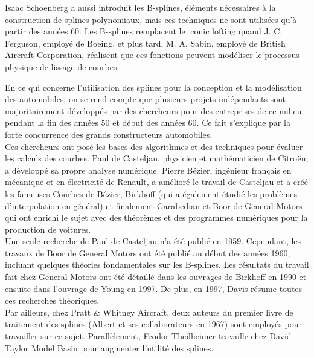 \documentclass{article}
\begin{document}
\indent
	Isaac Schoenberg a aussi introduit les B-splines, \'{e}l\'{e}ments n\'{e}cessaires \`{a} la construction de splines polynomiaux, mais ces techniques ne sont utilis\'{e}es qu'\`{a} partir des ann\'{e}es 60. Les B-splines remplacent le \guillemotleft $\;$conic lofting \guillemotright quand J. C. Ferguson, employ\'{e} de Boeing, et plus tard, M. A. Sabin, employ\'{e} de British Aircraft Corporation, r\'{e}alisent que ces fonctions peuvent mod\'{e}liser le processus physique de lissage de courbes.
\par
	En ce qui concerne l'utilisation des splines pour la conception et la mod\'{e}lisation des automobiles, on se rend compte que plusieurs projets ind\'{e}pendants sont majoritairement d\'{e}velopp\'{e}s par des chercheurs pour des entreprises de ce milieu pendant la fin des ann\'{e}es 50 et d\'{e}but des ann\'{e}es 60. Ce fait s'explique par la forte concurrence des grands constructeurs automobiles.
\\
\indent
	Ces chercheurs ont pos\'{e} les bases des algorithmes et des techniques pour \'{e}valuer les calculs des courbes. Paul de Casteljau, physicien et math\'{e}maticien de Citro\"{e}n, a d\'{e}velopp\'{e} sa propre analyse num\'{e}rique. Pierre B\'{e}zier, ing\'{e}nieur français en m\'{e}canique et en \'{e}lectricit\'{e} de Renault, a am\'{e}lior\'{e} le travail de Casteljau et a cr\'{e}\'{e} les fameuses Courbes de B\'{e}zier, Birkhoff (qui a \'{e}galement \'{e}tudi\'{e} les probl\`{e}mes d'interpolation en g\'{e}n\'{e}ral) et finalement Garabedian et Boor de General Motors qui ont enrichi le sujet avec des th\'{e}or\`{e}mes et des programmes num\'{e}riques pour la production de voitures.
\\
\indent
	Une seule recherche de Paul de Casteljau n'a \'{e}t\'{e} publi\'{e} en 1959. Cependant, les travaux de Boor de General Motors ont \'{e}t\'{e} publi\'{e} au d\'{e}but des ann\'{e}es 1960, incluant quelques th\'{e}ories fondamentales sur les B-splines. Les r\'{e}sultats du travail fait chez General Motors ont \'{e}t\'{e} d\'{e}taill\'{e} dans les ouvrages de Birkhoff en 1990 et ensuite dans l'ouvrage de Young en 1997. De plus, en 1997, Davis r\'{e}sume toutes ces recherches th\'{e}oriques.
\\
\indent
	Par ailleurs, chez Pratt \& Whitney Aircraft, deux auteurs du premier livre de traitement des splines (Albert et ses collaborateurs en 1967) sont employ\'{e}s pour travailler sur ce sujet. Parall\`{e}lement, Feodor Theilheimer travaille chez David Taylor Model Basin pour augmenter l'utilit\'{e} des splines. 
\end{document}
